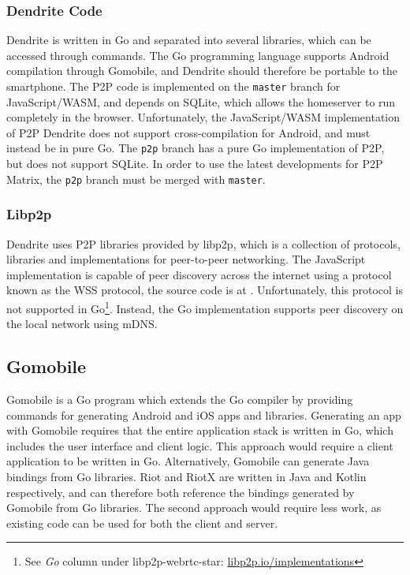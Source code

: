 \subsubsection{Dendrite Code}
Dendrite is written in Go\cite{golang_org} and separated into several libraries, which can be accessed through commands.
The Go programming language supports Android compilation through Gomobile\cite{gomobile}, and Dendrite should therefore be portable to the smartphone.
The \ac{P2P} code is implemented on the \texttt{master} branch for JavaScript/WASM, and depends on SQLite, which allows the homeserver to run completely in the browser.
Unfortunately, the JavaScript/WASM implementation of \ac{P2P} Dendrite does not support cross-compilation for Android, and must instead be in pure Go.
The \texttt{p2p} branch has a pure Go implementation of \ac{P2P}, but does not support SQLite.
In order to use the latest developments for \ac{P2P} Matrix, the \texttt{p2p} branch must be merged with \texttt{master}.

\subsubsection{Libp2p}
Dendrite uses \ac{P2P} libraries provided by libp2p, which is a collection of protocols, libraries and implementations for peer-to-peer networking\cite{libp2p}.
The JavaScript implementation is capable of peer discovery across the internet using a protocol known as the \ac{WSS} protocol, the source code is at .
Unfortunately, this protocol is not supported in Go\footnote{See \textit{Go} column under libp2p-webrtc-star: \url{libp2p.io/implementations}}.
Instead, the Go implementation supports peer discovery on the local network using \ac{mDNS}.

\subsection{Gomobile}\label{sec:gomobile}
Gomobile is a Go program which extends the Go compiler by providing commands for generating Android and iOS apps and libraries\cite{gomobile}.
Generating an app with Gomobile requires that the entire application stack is written in Go, which includes the user interface and client logic.
This approach would require a client application to be written in Go.
Alternatively, Gomobile can generate Java bindings from Go libraries.
Riot and RiotX are written in Java and Kotlin respectively, and can therefore both reference the bindings generated by Gomobile from Go libraries.
The second approach would require less work, as existing code can be used for both the client and server.

